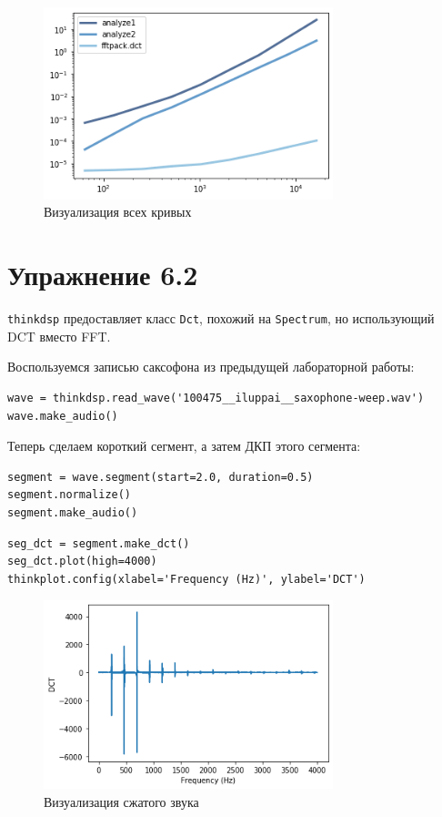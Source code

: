 \documentclass[a4paper,12pt]{report}
\begin{document}
\begin{figure}[H]
        \centering
        \includegraphics[width=0.75\textwidth]{lab6_fig1_4.png}
        \caption{Визуализация всех кривых}
        \label{fig:lab6_fig1_4}
\end{figure}

\chapter{Упражнение 6.2}

\texttt{thinkdsp} предоставляет класс \texttt{Dct}, похожий на \texttt{Spectrum}, но использующий DCT вместо FFT.

Воспользуемся записью саксофона из предыдущей лабораторной работы:

\begin{lstlisting}[caption=Загрузка звука]
wave = thinkdsp.read_wave('100475__iluppai__saxophone-weep.wav')
wave.make_audio()
\end{lstlisting}

Теперь сделаем короткий сегмент, а затем ДКП этого сегмента:

\begin{lstlisting}[caption=Сегмент звука]
segment = wave.segment(start=2.0, duration=0.5)
segment.normalize()
segment.make_audio()
\end{lstlisting}

\begin{lstlisting}[caption=Сжатие звука]
seg_dct = segment.make_dct()
seg_dct.plot(high=4000)
thinkplot.config(xlabel='Frequency (Hz)', ylabel='DCT')
\end{lstlisting}

\begin{figure}[H]
        \centering
        \includegraphics[width=0.75\textwidth]{lab6_fig2_1.png}
        \caption{Визуализация сжатого звука}
        \label{fig:lab6_fig2_1}
\end{figure}
\end{document}
